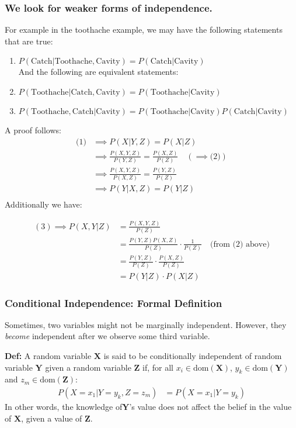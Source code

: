 \documentclass{article}
\def\blu#1{{\color{blu}#1}}
\begin{document}
\subsubsection*{We look for weaker forms of independence.}
For example in the toothache example, we may have the following statements that are true:
\begin{enumerate}
	\item $ P(\text{Catch} | \text{Toothache},\text{Cavity}) = P(\text{Catch} | \text{Cavity}) $\\
	And the following are equivalent statements:
	\item $ P(\text{Toothache} | \text{Catch}, \text{Cavity}) = P(\text{Toothache} | \text{Cavity}) $
	\item $ P(\text{Toothache}, \text{Catch} | \text{Cavity}) =P(\text{Toothache} | \text{Cavity}) P(\text{Catch} | \text{Cavity}) $
\end{enumerate}
A proof follows:
\begin{align*}
\text{(1)} &\implies P(X | Y,Z) = P(X|Z) \\
&\implies \frac{P(X,Y,Z)}{P(Y,Z)} = \frac{P(X,Z)}{P(Z)} \quad (\implies \text{(2)}) \\
&\implies \frac{P(X,Y,Z)}{P(X,Z)} = \frac{P(Y,Z)}{P(Z)} \\
& \implies P(Y | X,Z) = P(Y | Z) \\
\end{align*}
Additionally we have:

\begin{align*}
(3) \implies P(X,Y | Z) &= \frac{P(X,Y,Z)}{P(Z)}\\ 
&=  \frac{P(Y,Z)P(X,Z)}{P(Z)} \cdot \frac{1}{P(Z)} \quad \text{(from (2) above)} \\
&= \frac{P(Y,Z)}{P(Z)} \cdot \frac{P(X,Z)}{P(Z)} \\
&= P(Y|Z) \cdot P(X|Z)
\end{align*}

\subsubsection*{Conditional Independence: Formal Definition}
Sometimes, two variables might not be marginally independent. However, they \textit{become} independent after we observe some third variable. 
\begin{siderules}
\textbf{Def:} A random variable $\mathbf{X}$ is said to be \blu{conditionally independent} of random variable $\mathbf{Y}$ given a random variable $\mathbf{Z}$ if, for all $ x_i \in \text{dom}(\mathbf{X})  $, $ y_k \in \text{dom}(\mathbf{Y})  $ and $ z_m \in \text{dom}(\mathbf{Z})  $:
\begin{align*}
P(X = x_1 | Y = y_k, Z = z_m) &= P(X = x_1 | Y = y_k)
\end{align*}
In other words, the knowledge of$\mathbf{Y}$'s value does not affect the belief in the value of $\mathbf{X}$, given a value of $\mathbf{Z}$.
	\end{siderules}
\end{document}
